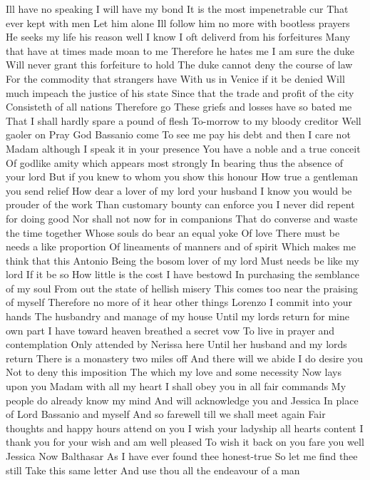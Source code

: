 Ill have no speaking I will have my bond
It is the most impenetrable cur
That ever kept with men
Let him alone
Ill follow him no more with bootless prayers
He seeks my life his reason well I know
I oft deliverd from his forfeitures
Many that have at times made moan to me
Therefore he hates me
I am sure the duke
Will never grant this forfeiture to hold
The duke cannot deny the course of law
For the commodity that strangers have
With us in Venice if it be denied
Will much impeach the justice of his state
Since that the trade and profit of the city
Consisteth of all nations Therefore go
These griefs and losses have so bated me
That I shall hardly spare a pound of flesh
To-morrow to my bloody creditor
Well gaoler on Pray God Bassanio come
To see me pay his debt and then I care not
Madam although I speak it in your presence
You have a noble and a true conceit
Of godlike amity which appears most strongly
In bearing thus the absence of your lord
But if you knew to whom you show this honour
How true a gentleman you send relief
How dear a lover of my lord your husband
I know you would be prouder of the work
Than customary bounty can enforce you
I never did repent for doing good
Nor shall not now for in companions
That do converse and waste the time together
Whose souls do bear an equal yoke Of love
There must be needs a like proportion
Of lineaments of manners and of spirit
Which makes me think that this Antonio
Being the bosom lover of my lord
Must needs be like my lord If it be so
How little is the cost I have bestowd
In purchasing the semblance of my soul
From out the state of hellish misery
This comes too near the praising of myself
Therefore no more of it hear other things
Lorenzo I commit into your hands
The husbandry and manage of my house
Until my lords return for mine own part
I have toward heaven breathed a secret vow
To live in prayer and contemplation
Only attended by Nerissa here
Until her husband and my lords return
There is a monastery two miles off
And there will we abide I do desire you
Not to deny this imposition
The which my love and some necessity
Now lays upon you
Madam with all my heart
I shall obey you in all fair commands
My people do already know my mind
And will acknowledge you and Jessica
In place of Lord Bassanio and myself
And so farewell till we shall meet again
Fair thoughts and happy hours attend on you
I wish your ladyship all hearts content
I thank you for your wish and am well pleased
To wish it back on you fare you well Jessica
Now Balthasar
As I have ever found thee honest-true
So let me find thee still Take this same letter
And use thou all the endeavour of a man
